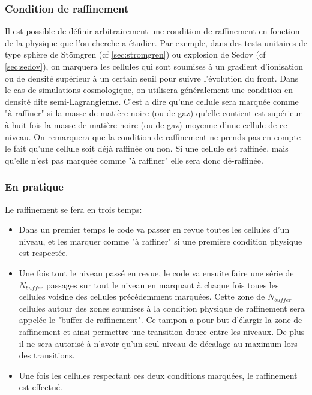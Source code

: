 \subsubsection{Condition de raffinement}
Il est possible de définir arbitrairement une condition de raffinement en fonction de la physique que l'on cherche a étudier.
Par exemple, dans des tests unitaires de type sphère de Stömgren (cf \ref{sec:stromgren}) ou explosion de Sedov (cf \ref{sec:sedov}), on marquera les cellules qui sont soumises à un gradient d'ionisation ou de densité supérieur à un certain seuil pour suivre l'évolution du front.
Dans le cas de simulations cosmologique, on utilisera généralement une condition en densité dite semi-Lagrangienne.
C'est a dire qu'une cellule sera marquée comme "à raffiner" si la masse de matière noire (ou de gaz) qu'elle contient est supérieur à huit fois la masse de matière noire (ou de gaz) moyenne d'une cellule de ce niveau.
On remarquera que la condition de raffinement ne prends pas en compte le fait qu'une cellule soit déjà raffinée ou non.
Si une cellule est raffinée, mais qu'elle n'est pas marquée comme "à raffiner" elle sera donc dé-raffinée.

\subsubsection{En pratique}
Le raffinement se fera en trois temps:

\begin{itemize}
\item Dans un premier temps le code va passer en revue toutes les cellules d'un niveau, et les marquer comme "à raffiner" si une première condition physique est respectée.

\item Une fois tout le niveau passé en revue, le code va ensuite faire une série de $N_{buffer}$ passages sur tout le niveau en marquant à chaque fois toues les cellules voisine des cellules précédemment marquées.
Cette zone de $N_{buffer}$ cellules autour des zones soumises à la condition physique de raffinement sera appelée le "buffer de raffinement".
Ce tampon a pour but d’élargir la zone de raffinement et ainsi permettre une transition douce entre les niveaux.
De plus il ne sera autorisé à n'avoir qu'un seul niveau de décalage au maximum lors des transitions.

\item Une fois les cellules respectant ces deux conditions marquées, le raffinement est effectué.
\end{itemize}

